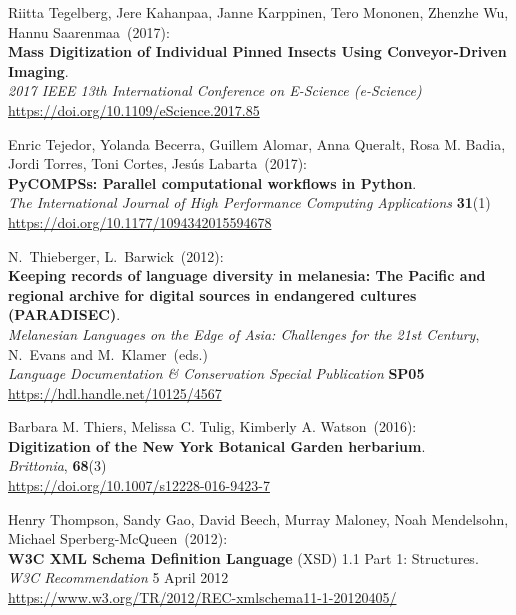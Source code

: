 \begin{thebibliography}{9}
Riitta Tegelberg, Jere Kahanpaa, Janne Karppinen, Tero Mononen, Zhenzhe Wu, Hannu Saarenmaa~(2017): \\
\textbf{Mass Digitization of Individual Pinned Insects Using Conveyor-Driven Imaging}.\\
\emph{2017 IEEE 13th International Conference on E-Science (e-Science)}\\
\url{https://doi.org/10.1109/eScience.2017.85}

Enric Tejedor, Yolanda Becerra, Guillem Alomar, Anna Queralt, Rosa M. Badia, Jordi Torres, Toni Cortes, Jesús Labarta~(2017): \\
\textbf{PyCOMPSs: Parallel computational workflows in Python}.\\
\emph{The International Journal of High Performance Computing Applications}
\textbf{31}(1) \\
\url{https://doi.org/10.1177/1094342015594678}

N.~Thieberger, L.~Barwick~(2012): \\
\textbf{Keeping records of language diversity in melanesia: The Pacific and regional archive for digital sources in endangered cultures (PARADISEC)}.\\
\emph{Melanesian Languages on the Edge of Asia: Challenges for the 21st Century}, N.~Evans and M.~Klamer~(eds.)\\
\emph{Language Documentation \& Conservation Special Publication}
\textbf{SP05} \\
\url{https://hdl.handle.net/10125/4567}

Barbara M. Thiers, Melissa C. Tulig, Kimberly A. Watson~(2016): \\
\textbf{Digitization of the New York Botanical Garden herbarium}.\\
\emph{Brittonia}, \textbf{68}(3)\\
\url{https://doi.org/10.1007/s12228-016-9423-7}


Henry Thompson, Sandy Gao, David Beech, Murray Maloney, Noah Mendelsohn, Michael Sperberg-McQueen~(2012): \\
\textbf{W3C XML Schema Definition Language} ({XSD}) 1.1 {Part} 1: {Structures}. \\
\emph{W3C Recommendation} 5 April 2012 \\
\url{https://www.w3.org/TR/2012/REC-xmlschema11-1-20120405/}


\end{thebibliography}
